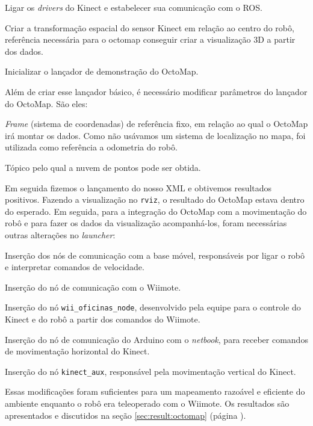 \begin{compactitem}
\item Ligar os \textit{drivers} do Kinect e estabelecer sua comunicação com o ROS.
\item Criar a transformação espacial do sensor Kinect em relação ao centro do robô, referência necessária para o octomap conseguir criar a visualização 3D a partir dos dados.
\item Inicializar o lançador de demonstração do OctoMap.
\end{compactitem}  

Além de criar esse lançador básico, é necessário modificar parâmetros do lançador do OctoMap. São eles:

\begin{compactitem}
\item \textit{Frame} (sistema de coordenadas) de referência fixo, em relação ao qual o OctoMap irá montar os dados. Como não usávamos um sistema de localização no mapa, foi utilizada como referência a odometria do robô.
\item Tópico pelo qual a nuvem de pontos pode ser obtida.
\end{compactitem} 

Em seguida fizemos o lançamento do nosso XML e obtivemos resultados positivos. Fazendo a visualização no \verb|rviz|, o resultado do OctoMap estava dentro do esperado. Em seguida, para a integração do OctoMap com a movimentação do robô e para fazer os dados da visualização acompanhá-los, foram necessárias outras alterações no \textit{launcher}:

\begin{compactitem}
\item Inserção dos nós de comunicação com a base móvel, responsáveis por ligar o robô e interpretar comandos de velocidade.
\item Inserção do nó de comunicação com o Wiimote.
\item Inserção do nó \verb|wii_oficinas_node|, desenvolvido pela equipe para o controle do Kinect e do robô a partir dos comandos do Wiimote.
\item Inserção do nó de comunicação do Arduino com o \textit{netbook}, para receber comandos de movimentação horizontal do Kinect.
\item Inserção do nó \verb|kinect_aux|, responsável pela movimentação vertical do Kinect. 
\end{compactitem} 

Essas modificações foram suficientes para um mapeamento razoável e eficiente do ambiente enquanto o robô era teleoperado com o Wiimote. Os resultados são apresentados e discutidos na seção \ref{sec:result:octomap} (página \pageref{sec:result:octomap}).

